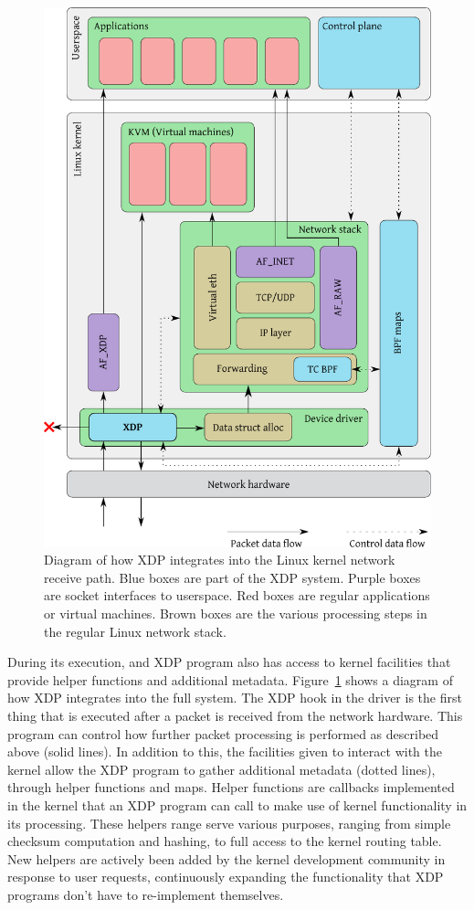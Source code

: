 \documentclass[10pt]{sig-alternate-05-2015}
\begin{document}
\begin{figure}[t]
\centering
\includegraphics[width=\linewidth]{figures/kernel-diagram.pdf}
\caption{\label{fig:xdp-kernel} Diagram of how XDP integrates into the Linux
  kernel network receive path. Blue boxes are part of the XDP system. Purple
  boxes are socket interfaces to userspace. Red boxes are regular applications
  or virtual machines. Brown boxes are the various processing steps in the
  regular Linux network stack.}
\end{figure}

During its execution, and XDP program also has access to kernel facilities that
provide helper functions and additional metadata. Figure~\ref{fig:xdp-kernel}
shows a diagram of how XDP integrates into the full system. The XDP hook in the
driver is the first thing that is executed after a packet is received from the
network hardware. This program can control how further packet processing is
performed as described above (solid lines). In addition to this, the facilities
given to interact with the kernel allow the XDP program to gather additional
metadata (dotted lines), through helper functions and maps. Helper functions are
callbacks implemented in the kernel that an XDP program can call to make use of
kernel functionality in its processing. These helpers range serve various
purposes, ranging from simple checksum computation and hashing, to full access
to the kernel routing table. New helpers are actively been added by the kernel
development community in response to user requests, continuously expanding the
functionality that XDP programs don't have to re-implement themselves.
\end{document}
